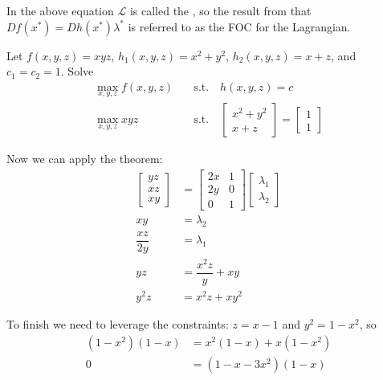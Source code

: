 \documentclass{article}
\begin{document}
In the above equation $\mathcal{L}$ is called the , so the result from  that $Df(x^*) = Dh(x^*) \lambda^*$ is referred to as the FOC for the Lagrangian.
\begin{example}
  Let $f(x, y, z) = xyz$, $h_1(x, y, z) = x^2 + y^2$, $h_2(x, y, z) = x + z$, and $c_1 = c_2 = 1$. Solve
  \begin{align*}
    \max_{x, y, z} f(x, y, z)
    &
    \quad\text{s.t.}\quad
    h(x, y, z) = c
    \\
    \max_{x, y, z} xyz
    &
    \quad\text{s.t.}\quad
    \begin{bmatrix}
      x^2 + y^2
      \\
      x + z
    \end{bmatrix}
    =
    \begin{bmatrix}
      1 \\ 1
    \end{bmatrix}
  \end{align*}

  Now we can apply the theorem:
  \begin{align*}
    \begin{bmatrix}
      yz \\ xz \\ xy
    \end{bmatrix}
    &
    =
    \begin{bmatrix}
      2x & 1
      \\
      2y & 0
      \\
      0  & 1
    \end{bmatrix}
    \begin{bmatrix}
      \lambda_1 \\ \lambda_2
    \end{bmatrix}
    \\
    xy
    &
    =
    \lambda_2
    \\
    \dfrac{xz}{2y}
    &
    =
    \lambda_1
    \\
    yz
    &
    =
    \dfrac{x^2z}{y} + xy
    \\
    y^2z
    &
    =
    x^2z + xy^2
  \end{align*}

  To finish we need to leverage the constraints: $z = x - 1$ and $y^2 = 1 - x^2$, so
  \begin{align*}
    (1 - x^2) (1 - x)
    &
    =
    x^2 (1 - x) + x (1 - x^2)
    \\
    0
    &
    =
    (1 - x - 3x^2) (1 - x)
  \end{align*}


\end{example}
\end{document}
